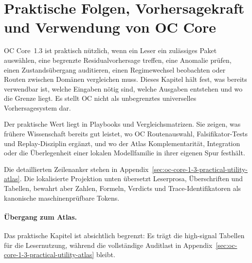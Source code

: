 \section{Praktische Folgen, Vorhersagekraft und Verwendung von OC Core}
\label{sec:oc-core-1-3-practical-utility}
\label{sec:oc-core-1-3-practical-utility-de}

OC Core~1.3 ist praktisch nützlich, wenn ein Leser ein zulässiges Paket
auswählen, eine begrenzte Residualvorhersage treffen, eine Anomalie prüfen,
einen Zustandsübergang auditieren, einen Regimewechsel beobachten oder Routen
zwischen Domänen vergleichen muss. Dieses Kapitel hält fest, was bereits
verwendbar ist, welche Eingaben nötig sind, welche Ausgaben entstehen und wo
die Grenze liegt. Es stellt OC nicht als unbegrenztes universelles
Vorhersagesystem dar.

Der praktische Wert liegt in Playbooks und Vergleichsmatrizen. Sie zeigen, was
frühere Wissenschaft bereits gut leistet, wo OC Routenauswahl,
Falsifikator-Tests und Replay-Disziplin ergänzt, und wo der Atlas
Komplementarität, Integration oder die Überlegenheit einer lokalen Modellfamilie
in ihrer eigenen Spur festhält.

Die detaillierten Zeilenanker stehen in
Appendix~\ref{sec:oc-core-1-3-practical-utility-atlas}. Die lokalisierte
Projektion unten übersetzt Leserprosa, Überschriften und Tabellen, bewahrt aber
Zahlen, Formeln, Verdicts und Trace-Identifikatoren als kanonische
maschinenprüfbare Tokens.

\begingroup
\small

\endgroup

\paragraph{Übergang zum Atlas.}
Das praktische Kapitel ist absichtlich begrenzt: Es trägt die high-signal
Tabellen für die Lesernutzung, während die vollständige Auditlast in
Appendix~\ref{sec:oc-core-1-3-practical-utility-atlas} bleibt.
